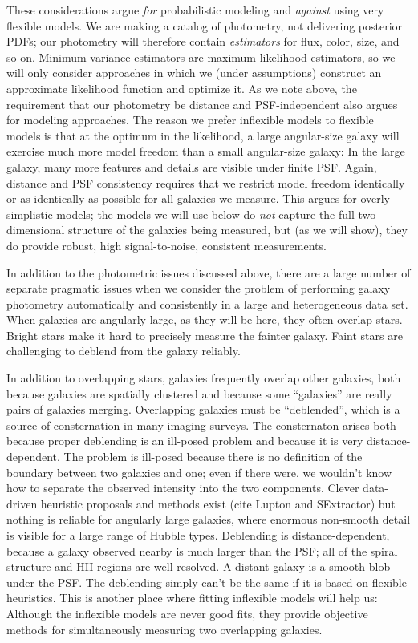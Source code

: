 \documentclass[12pt,preprint,pdftex]{aastex}
\begin{document}
These considerations argue \emph{for} probabilistic modeling and
\emph{against} using very flexible models.  We are making a catalog of
photometry, not delivering posterior PDFs; our photometry will
therefore contain \emph{estimators} for flux, color, size, and so-on.
Minimum variance estimators are maximum-likelihood estimators, so we
will only consider approaches in which we (under assumptions)
construct an approximate likelihood function and optimize it.  As we
note above, the requirement that our photometry be distance and
PSF-independent also argues for modeling approaches.  The reason we
prefer inflexible models to flexible models is that at the optimum in
the likelihood, a large angular-size galaxy will exercise much more
model freedom than a small angular-size galaxy: In the large galaxy,
many more features and details are visible under finite PSF.  Again,
distance and PSF consistency requires that we restrict model freedom
identically or as identically as possible for all galaxies we measure.
This argues for overly simplistic models; the models we will use below
do \emph{not} capture the full two-dimensional structure of the
galaxies being measured, but (as we will show), they do provide
robust, high signal-to-noise, consistent measurements.

In addition to the photometric issues discussed above, there are a
large number of separate pragmatic issues when we consider the problem
of performing galaxy photometry automatically and consistently in a
large and heterogeneous data set.  When galaxies are angularly large,
as they will be here, they often overlap stars.  Bright stars make it
hard to precisely measure the fainter galaxy.  Faint stars are
challenging to deblend from the galaxy reliably.



In addition to overlapping stars, galaxies frequently overlap other
galaxies, both because galaxies are spatially clustered and because
some ``galaxies'' are really pairs of galaxies merging.  Overlapping
galaxies must be ``deblended'', which is a source of consternation in
many imaging surveys.  The consternaton arises both because proper
deblending is an ill-posed problem and because it is very
distance-dependent.  The problem is ill-posed because there is no
definition of the boundary between two galaxies and one; even if there
were, we wouldn't know how to separate the observed intensity into the
two components.  Clever data-driven heuristic proposals and methods
exist (cite Lupton and SExtractor) but nothing is reliable for
angularly large galaxies, where enormous non-smooth detail is visible
for a large range of Hubble types.  Deblending is distance-dependent,
because a galaxy observed nearby is much larger than the PSF; all of
the spiral structure and HII regions are well resolved.  A distant
galaxy is a smooth blob under the PSF.  The deblending simply can't be
the same if it is based on flexible heuristics.  This is another place
where fitting inflexible models will help us: Although the inflexible
models are never good fits, they provide objective methods for
simultaneously measuring two overlapping galaxies.
\end{document}

